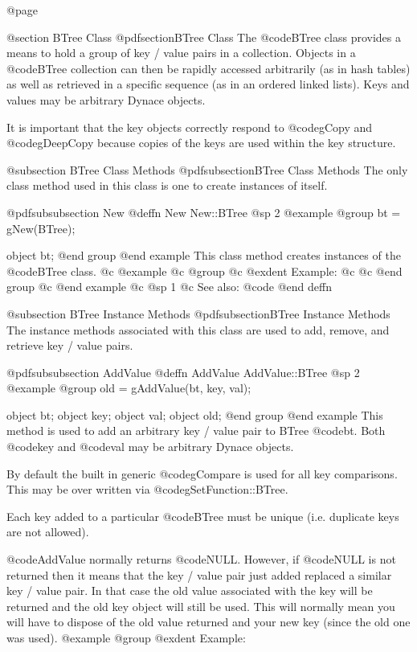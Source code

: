 @page

@section BTree Class
@pdfsection{BTree Class}
The @code{BTree} class provides a means to hold a group of key / value
pairs in a collection.  Objects in a @code{BTree} collection can then be
rapidly accessed arbitrarily (as in hash tables) as well as retrieved in
a specific sequence (as in an ordered linked lists).  Keys and values
may be arbitrary Dynace objects.

It is important that the key objects correctly respond to @code{gCopy}
and @code{gDeepCopy} because copies of the keys are used within the key
structure.

@subsection BTree Class Methods
@pdfsubsection{BTree Class Methods}
The only class method used in this class is one to create instances of itself.



@pdfsubsubsection {New}
@deffn {New} New::BTree
@sp 2
@example
@group
bt = gNew(BTree);

object  bt;
@end group
@end example
This class method creates instances of the @code{BTree} class. 
@c @example
@c @group
@c @exdent Example:
@c 
@c @end group
@c @end example
@c @sp 1
@c See also:  @code{}
@end deffn



@subsection BTree Instance Methods
@pdfsubsection{BTree Instance Methods}
The instance methods associated with this class are used to add, remove,
and retrieve key / value pairs.





@pdfsubsubsection {AddValue}
@deffn {AddValue} AddValue::BTree
@sp 2
@example
@group
old = gAddValue(bt, key, val);

object  bt;
object  key;
object  val;
object  old;
@end group
@end example
This method is used to add an arbitrary key / value pair to BTree
@code{bt}.  Both @code{key} and @code{val} may be arbitrary Dynace
objects.

By default the built in generic @code{gCompare} is used for all key comparisons.
This may be over written via @code{gSetFunction::BTree}.

Each key added to a particular @code{BTree} must be unique
(i.e. duplicate keys are not allowed).

@code{AddValue} normally returns @code{NULL}.  However, if @code{NULL}
is not returned then it means that the key / value pair just added
replaced a similar key / value pair.  In that case the old value
associated with the key will be returned and the old key object will
still be used.  This will normally mean you will have to dispose of
the old value returned and your new key (since the old one was used).
@example
@group
@exdent Example:


